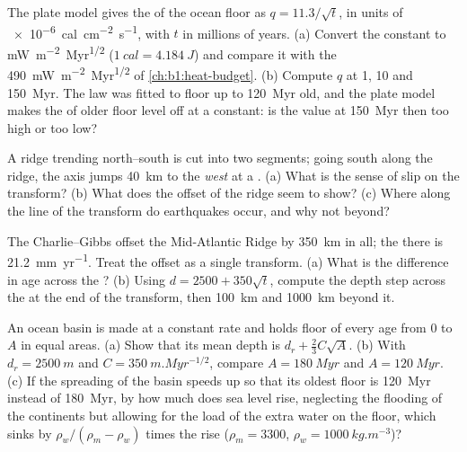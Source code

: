 \begin{exercise}[$\star\star$]\label{exo:b1:rifts-ridges-margins:7}
The plate model gives the  of the ocean floor as $q = 11.3/\sqrt t$,
in units of \qty{e-6}{cal.cm^{-2}.s^{-1}}, with $t$ in millions of years.
(a) Convert the constant to \unit{mW.m^{-2}.Myr^{1/2}} ($\qty{1}{cal} =
\qty{4.184}{J}$) and compare it with the \qty{490}{mW.m^{-2}.Myr^{1/2}} of
\cref{ch:b1:heat-budget}. (b) Compute $q$ at 1, 10 and \qty{150}{Myr}. The law
was fitted to floor up to \qty{120}{Myr} old, and the plate model makes the
 of older floor level off at a constant: is the value at
\qty{150}{Myr} then too high or too low?
\end{exercise}

\begin{exercise}[$\star\star$]\label{exo:b1:rifts-ridges-margins:8}
A ridge trending north--south is cut into two segments; going south along the
ridge, the axis jumps \qty{40}{km} to the \emph{west} at a .
(a) What is the sense of slip on the transform? (b) What does the offset of
the ridge seem to show? (c) Where along the line of the transform do
earthquakes occur, and why not beyond?
\end{exercise}

\begin{exercise}[$\star\star$]\label{exo:b1:rifts-ridges-margins:9}
The Charlie--Gibbs  offset the Mid-Atlantic Ridge by
\qty{350}{km} in all; the  there is \qty{21.2}{mm.yr^{-1}}.
Treat the offset as a single transform. (a) What is the difference in age
across the ? (b) Using $d = 2500 + 350\sqrt t$, compute the depth
step across the  at the end of the transform, then \qty{100}{km}
and \qty{1000}{km} beyond it.
\end{exercise}

\begin{exercise}[$\star\star\star$]\label{exo:b1:rifts-ridges-margins:10}
An ocean basin is made at a constant rate and holds floor of every age from 0
to $A$ in equal areas. (a) Show that its mean depth is $d_r +
\frac23C\sqrt A$. (b) With $d_r = \qty{2500}{m}$ and
$C = \qty{350}{m.Myr^{-1/2}}$, compare $A = \qty{180}{Myr}$ and
$A = \qty{120}{Myr}$. (c) If the spreading of the basin speeds up so that its
oldest floor is \qty{120}{Myr} instead of \qty{180}{Myr}, by how much does
sea level rise, neglecting the flooding of the continents but allowing for the
load of the extra water on the floor, which sinks by $\rho_w/(\rho_m - \rho_w)$
times the rise ($\rho_m = 3300$, $\rho_w = \qty{1000}{kg.m^{-3}}$)?
\end{exercise}

